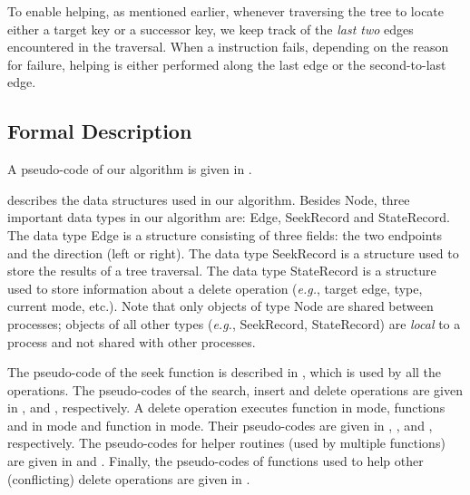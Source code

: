 \begin{limitscope}
To enable helping, as mentioned earlier, whenever traversing the tree to locate either a target key or a successor key, we keep track of the \emph{last two} edges encountered in the traversal. When a \CAS{} instruction fails, depending on the reason for failure, helping is either performed along the last edge or the second-to-last edge. 


\subsection{Formal Description}
A pseudo-code of our algorithm is given in .

 describes the data structures used in our algorithm. Besides \textsf{Node}, three important data types in our algorithm are: \textsf{Edge}, \textsf{SeekRecord} and \textsf{StateRecord}. The data type \textsf{Edge} is a structure consisting of three fields: the two endpoints and the direction (left or right). The data type \textsf{SeekRecord} is a structure used to store the results of a tree traversal. The data type \textsf{StateRecord} is a structure used to store information about a delete operation (\emph{e.g.}, target edge, type,  current mode, etc.). Note that only objects of type \textsf{Node} are shared between processes; objects of all other types (\emph{e.g.}, \textsf{SeekRecord}, \textsf{StateRecord}) are \emph{local} to a process and not shared with other processes.

The pseudo-code of the seek function is described in , which is used by all the operations. The pseudo-codes of the search, insert and delete operations are given in ,  and , respectively. A delete operation executes  function \Inject{} in \injection{} mode, functions \FindAndMarkSuccessor{} and \RemoveSuccessor{} in \discovery{} mode and function \Cleanup{} in \cleanup{} mode. Their pseudo-codes are given in , ,  and , respectively. The pseudo-codes for helper routines (used by multiple functions) are given in  and . Finally, the pseudo-codes of functions used to help other (conflicting) delete operations are given in .


\end{limitscope}